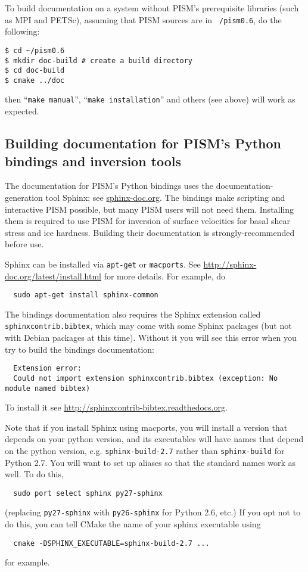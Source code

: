 \documentclass[titlepage,letterpaper,final]{scrartcl}
\begin{document}
To build documentation on a system without PISM's prerequisite
libraries (such as MPI and PETSc), assuming that PISM sources are in \texttt{~/pism0.6}, do the following:
\begin{verbatim}
$ cd ~/pism0.6
$ mkdir doc-build # create a build directory
$ cd doc-build
$ cmake ../doc
\end{verbatim}
then ``\texttt{make manual}'', ``\texttt{make installation}'' and
others (see above) will work as expected.

\subsection{Building documentation for PISM's Python bindings and inversion tools}
The documentation for PISM's Python bindings uses the documentation-generation tool Sphinx; see \href{http://sphinx-doc.org/}{sphinx-doc.org}.  The bindings make scripting and interactive PISM possible, but many PISM users will not need them.  Installing them is required to use PISM for inversion of surface velocities for basal shear stress and ice hardness.  Building their documentation is strongly-recommended before use.

Sphinx can be installed via \texttt{apt-get} or \texttt{macports}.
See \url{http://sphinx-doc.org/latest/install.html} for more details.  For example, do
\begin{verbatim}
  sudo apt-get install sphinx-common
\end{verbatim}

The bindings documentation also requires the Sphinx extension called \texttt{sphinxcontrib.bibtex}, which may come with some Sphinx packages (but not with Debian packages at this time).  Without it you will see this error when you try to build the bindings documentation:
\begin{verbatim}
  Extension error:
  Could not import extension sphinxcontrib.bibtex (exception: No module named bibtex)
\end{verbatim}
To install it see \url{http://sphinxcontrib-bibtex.readthedocs.org}.

Note that if you install Sphinx using macports,
you will install a version that depends on your python
version, and its executables will have names that
depend on the python version, e.g. \texttt{sphinx-build-2.7}
rather than \texttt{sphinx-build} for Python 2.7.  You will want to
set up aliases so that the standard names work as well. To do this,
\begin{verbatim}
  sudo port select sphinx py27-sphinx
\end{verbatim}
(replacing \texttt{py27-sphinx} with \texttt{py26-sphinx} for Python 2.6, etc.)
If you opt not to do this, you can tell CMake the
name of your sphinx executable using
\begin{verbatim}
  cmake -DSPHINX_EXECUTABLE=sphinx-build-2.7 ...
\end{verbatim}
for example.
\end{document}
